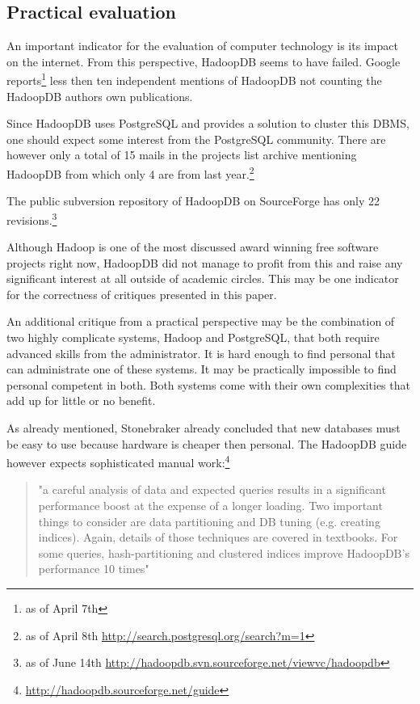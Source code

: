 \documentclass[12pt,a4paper]{scrartcl}		%
\begin{document}
\subsection{Practical evaluation}

An important indicator for the evaluation of computer technology is its impact on the internet. From this perspective, HadoopDB seems to have failed. Google reports\footnote{as of April 7th} less then ten independent mentions of HadoopDB not counting the HadoopDB authors own publications.

Since HadoopDB uses PostgreSQL and provides a solution to cluster this DBMS, one should expect some interest from the PostgreSQL community. There are however only a total of 15 mails in the projects list archive mentioning HadoopDB from which only 4 are from last year.\footnote{as of April 8th \url{http://search.postgresql.org/search?m=1}}

The public subversion repository of HadoopDB on SourceForge has only 22 revisions.\footnote{as of June 14th \url{http://hadoopdb.svn.sourceforge.net/viewvc/hadoopdb}}

Although Hadoop is one of the most discussed award winning free software projects right now, HadoopDB did not manage to profit from this and raise any significant interest at all outside of academic circles. This may be one indicator for the correctness of critiques presented in this paper.

An additional critique from a practical perspective may be the combination of two highly complicate systems, Hadoop and PostgreSQL, that both require advanced skills from the administrator. It is hard enough to find personal that can administrate one of these systems. It may be practically impossible to find personal competent in both. Both systems come with their own complexities that add up for little or no benefit.

As already mentioned, Stonebraker already concluded that new databases must be easy to use because hardware is cheaper then personal. The HadoopDB guide however expects sophisticated manual work:\footnote{\url{http://hadoopdb.sourceforge.net/guide}}
\begin{quote}
"a careful analysis of data and expected queries results in a significant performance boost at the expense of a longer loading. Two important things to consider are data partitioning and DB tuning (e.g. creating indices). Again, details of those techniques are covered in textbooks. For some queries, hash-partitioning and clustered indices improve HadoopDB's performance 10 times"  
\end{quote}



\newpage{}
{}

\end{document}
